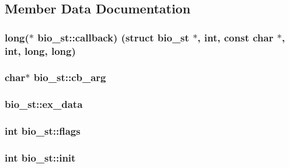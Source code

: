 \subsection{Member Data Documentation}
\subsubsection[{\texorpdfstring{callback}{callback}}]{\setlength{\rightskip}{0pt plus 5cm}long($\ast$ bio\+\_\+st\+::callback) (struct {\bf bio\+\_\+st} $\ast$, int, const char $\ast$, int, long, long)}\hypertarget{structbio__st_a6449aab690198cbecb3bc45d9cbf59ac}{}\label{structbio__st_a6449aab690198cbecb3bc45d9cbf59ac}
\subsubsection[{\texorpdfstring{cb\+\_\+arg}{cb_arg}}]{\setlength{\rightskip}{0pt plus 5cm}char$\ast$ bio\+\_\+st\+::cb\+\_\+arg}\hypertarget{structbio__st_a50cdd0a5e46c7253bc6ab1cb37abeaca}{}\label{structbio__st_a50cdd0a5e46c7253bc6ab1cb37abeaca}
\subsubsection[{\texorpdfstring{ex\+\_\+data}{ex_data}}]{ bio\+\_\+st\+::ex\+\_\+data}\hypertarget{structbio__st_a499ee1071ec22ec4da6086422785a0ca}{}\label{structbio__st_a499ee1071ec22ec4da6086422785a0ca}
\subsubsection[{\texorpdfstring{flags}{flags}}]{\setlength{\rightskip}{0pt plus 5cm}int bio\+\_\+st\+::flags}\hypertarget{structbio__st_aa815fc844603d4a3fcf7abebfeb3f546}{}\label{structbio__st_aa815fc844603d4a3fcf7abebfeb3f546}
\subsubsection[{\texorpdfstring{init}{init}}]{\setlength{\rightskip}{0pt plus 5cm}int bio\+\_\+st\+::init}\hypertarget{structbio__st_a365cca316f1daf354096eec7dbf98102}{}\label{structbio__st_a365cca316f1daf354096eec7dbf98102}
